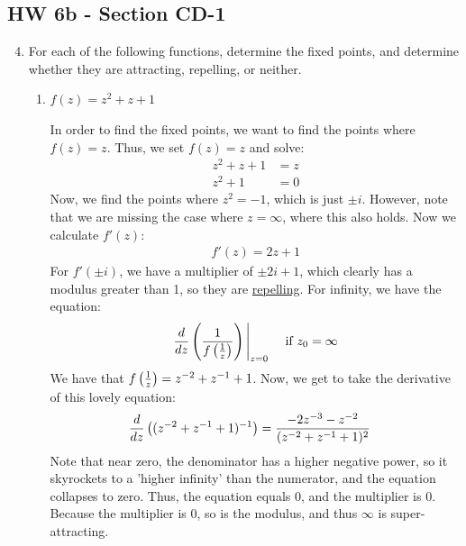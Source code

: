 \subsection*{HW 6b - Section CD-1}
\begin{enumerate}
\setcounter{enumi}{3}
\item For each of the following functions, determine the fixed points, and determine whether they are attracting, repelling, or neither.
	\begin{enumerate}
	\item $f(z) = z^2 +z +1$
	\begin{problem}
		In order to find the fixed points, we want to find the points where $f(z) = z$. Thus, we set $f(z) =z$ and solve:
		\begin{align*}
			z^2 + z + 1 &= z\\
			z^2 + 1 &= 0
		\end{align*}
		Now, we find the points where $z^2 = -1$, which is just $\pm i$. However, note that we are missing the case where $z = \infty$, where this also holds. Now we calculate $f'(z)$:
		\begin{align*}
			f'(z) = 2z + 1
		\end{align*}
		For $f'(\pm i)$, we have a multiplier of $\pm 2i +1$, which clearly has a modulus greater than 1, so they are \underline{repelling}. For infinity, we have the equation:
		\begin{align*}
			\displaystyle \frac{d}{dz}\left(\frac{1}{f\left(\frac{1}z\right)}\right)\Bigg|_{z=0} \quad \text{ if }z_0 = \infty
		\end{align*}
		We have that $f\left(\frac{1}z\right) = z^{-2}+z^{-1}+1$. Now, we get to take the derivative of this lovely equation:
		\begin{align*}
			\frac{d}{dz}\left((z^{-2}+z^{-1}+1)^{-1}\right) &= \frac{-2z^{-3}-z^{-2}}{(z^{-2}+z^{-1}+1)^{2}}
		\end{align*}
		Note that near zero, the denominator has a higher negative power, so it skyrockets to a 'higher infinity' than the numerator, and the equation collapses to zero. Thus, the equation equals 0, and the multiplier is 0. Because the multiplier is 0, so is the modulus, and thus $\infty$ is super-attracting. 
	\end{problem}
	

\end{enumerate}
\end{enumerate}
